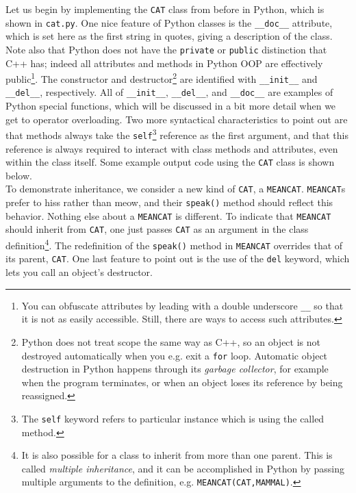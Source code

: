 

Let us begin by implementing the \texttt{CAT} class from before in Python,
which is shown in \texttt{cat.py}. One nice feature of Python classes
is the \texttt{\_\_doc\_\_} attribute, which is set here as the first string
in quotes, giving a description of the class. Note also that Python
does not have the \texttt{private} or \texttt{public} distinction that
C++ has; indeed all attributes and methods in Python OOP are effectively 
public\footnote{You can obfuscate attributes by leading with a double 
underscore \texttt{\_\_} so that it is not as easily accessible. Still, there 
are ways to access such attributes.}.
The constructor and destructor\footnote{Python does not treat scope the same
way as C++, so an object is not destroyed automatically when you e.g.
exit a \texttt{for} loop. Automatic object destruction in Python 
happens through 
its {\it garbage collector}, for example when the program terminates,
or when an object loses its reference by being reassigned.} are identified with
\texttt{\_\_init\_\_} and \texttt{\_\_del\_\_}, respectively. All of
\texttt{\_\_init\_\_}, \texttt{\_\_del\_\_}, and \texttt{\_\_doc\_\_} 
are examples of
Python special functions, which will be discussed in a bit more detail
when we get to operator overloading. 
Two more syntactical characteristics 
to point out are that methods always take the \texttt{self}\footnote{The
\texttt{self} keyword refers to particular instance which is using
the called method.} reference as 
the first argument, and that this reference is always required to
interact with class methods and attributes, even within the class itself.
Some example output code using the \texttt{CAT} class is shown below.\\




To demonstrate inheritance, we consider a new kind of \texttt{CAT}, a
\texttt{MEANCAT}. \texttt{MEANCAT}s prefer to hiss rather than meow, and
their \texttt{speak()} method should reflect this behavior. Nothing else
about a \texttt{MEANCAT} is different. To indicate that \texttt{MEANCAT}
should inherit from \texttt{CAT}, one just passes \texttt{CAT} as an argument
in the class definition\footnote{It is also possible for a class to inherit
from more than one parent. This is called {\it multiple inheritance},
 and it can be accomplished in Python by passing
multiple arguments to the definition, e.g. \texttt{MEANCAT(CAT,MAMMAL)}.}. 
The redefinition of the \texttt{speak()} method
in \texttt{MEANCAT} overrides that of its parent, \texttt{CAT}. One last
feature to point out is the use of the \texttt{del} keyword, which lets you
call an object's destructor.\\


